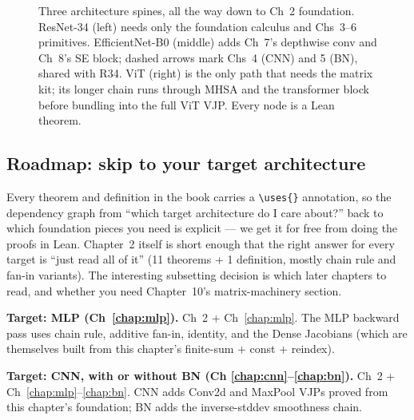 \begin{figure}[ht]
{}
\caption{Three architecture spines, all the way down to Ch~2 foundation. ResNet-34 (left) needs only the foundation calculus and Chs~3--6 primitives. EfficientNet-B0 (middle) adds Ch~7's depthwise conv and Ch~8's SE block; dashed arrows mark Chs~4 (CNN) and 5 (BN), shared with R34. ViT (right) is the only path that needs the matrix kit; its longer chain runs through MHSA and the transformer block before bundling into the full ViT VJP. Every node is a Lean theorem.}
\label{fig:spines}
\end{figure}

\subsection*{Roadmap: skip to your target architecture}

Every theorem and definition in the book carries a
\texttt{\textbackslash uses\{\}} annotation, so the dependency graph
from ``which target architecture do I care about?'' back to which
foundation pieces you need is explicit --- we get it for free from
doing the proofs in Lean. Chapter~2 itself is short enough that
the right answer for every target is ``just read all of it''
(11 theorems + 1 definition, mostly chain rule and fan-in
variants). The interesting subsetting decision is which later
chapters to read, and whether you need Chapter~10's matrix-machinery
section.

\textbf{Target: MLP (Ch~\ref{chap:mlp}).} Ch~2 + Ch~\ref{chap:mlp}.
The MLP backward pass uses chain rule, additive fan-in, identity,
and the Dense Jacobians (which are themselves built from this
chapter's finite-sum + const + reindex).

\textbf{Target: CNN, with or without BN (Ch \ref{chap:cnn}--\ref{chap:bn}).}
Ch~2 + Ch~\ref{chap:mlp}--\ref{chap:bn}. CNN adds Conv2d and MaxPool
VJPs proved from this chapter's foundation; BN adds the
inverse-stddev smoothness chain.


